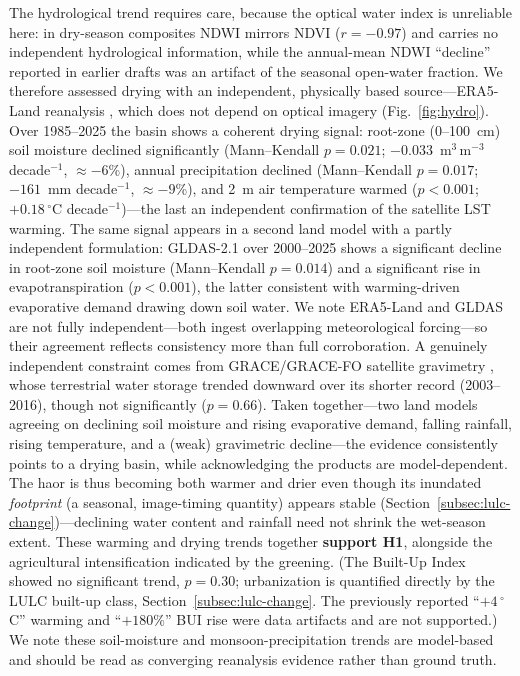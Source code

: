 \documentclass[preprint,authoryear,12pt]{elsarticle}
\begin{document}
The hydrological trend requires care, because the optical water index is unreliable here: in
dry-season composites NDWI mirrors NDVI ($r=-0.97$) and carries no independent hydrological
information, while the annual-mean NDWI ``decline'' reported in earlier drafts was an artifact of
the seasonal open-water fraction. We therefore assessed drying with an independent, physically
based source---ERA5-Land reanalysis \citep{MunozSabater2021}, which does not depend on optical
imagery (Fig.~\ref{fig:hydro}). Over 1985--2025 the basin shows a coherent drying signal:
root-zone (0--100~cm) soil moisture declined significantly (Mann--Kendall $p=0.021$;
$-0.033$~m$^3$\,m$^{-3}$ decade$^{-1}$, $\approx-6$\%), annual precipitation declined
(Mann--Kendall $p=0.017$; $-161$~mm decade$^{-1}$, $\approx-9$\%), and 2~m air temperature warmed
($p<0.001$; $+0.18\,^{\circ}$C decade$^{-1}$)---the last an independent confirmation of the
satellite LST warming. The same signal appears in a second land model with a partly independent
formulation: GLDAS-2.1 \citep{Rodell2004} over 2000--2025 shows a significant decline in root-zone
soil moisture (Mann--Kendall $p=0.014$) and a significant rise in evapotranspiration ($p<0.001$),
the latter consistent with warming-driven evaporative demand drawing down soil water. We note
ERA5-Land and GLDAS are not fully independent---both ingest overlapping meteorological forcing---so
their agreement reflects consistency more than full corroboration. A genuinely independent
constraint comes from GRACE/GRACE-FO satellite gravimetry \citep{Tapley2004}, whose terrestrial
water storage trended downward over its shorter record (2003--2016), though not significantly
($p=0.66$). Taken together---two land models agreeing on declining soil moisture and rising
evaporative demand, falling rainfall, rising temperature, and a (weak) gravimetric decline---the
evidence consistently points to a drying basin, while acknowledging the products are
model-dependent. The haor is thus becoming both warmer and drier even though its inundated
\emph{footprint} (a seasonal, image-timing quantity) appears stable
(Section~\ref{subsec:lulc-change})---declining water content and rainfall need not shrink the
wet-season extent. These warming and drying trends together \textbf{support H1}, alongside the
agricultural intensification indicated by the greening. (The Built-Up Index showed no significant
trend, $p=0.30$; urbanization is quantified directly by the LULC built-up class,
Section~\ref{subsec:lulc-change}. The previously reported ``$+4\,^{\circ}$C'' warming and
``$+180\%$'' BUI rise were data artifacts and are not supported.) We note these soil-moisture and
monsoon-precipitation trends are model-based and should be read as converging reanalysis evidence
rather than ground truth.
\end{document}
